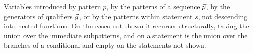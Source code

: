 Variables introduced by pattern $p$, by the patterns of a sequence $\seq{p}$, by the generators of qualifiers $\seq{g}$, or by the patterns
within statement $s$, not descending into nested functions. On the cases
not shown it recurses structurally, taking the union over the immediate subpatterns, and on a
statement is the union over the branches of a conditional and empty on the statements not shown.

